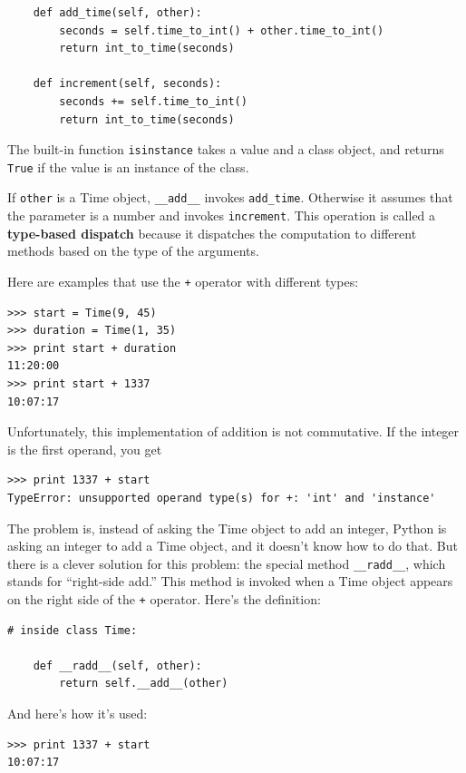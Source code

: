 \documentclass[10pt]{book}
\begin{document}
\begin{CJK}{UTF8}{gbsn}
\begin{verbatim}
    def add_time(self, other):
        seconds = self.time_to_int() + other.time_to_int()
        return int_to_time(seconds)

    def increment(self, seconds):
        seconds += self.time_to_int()
        return int_to_time(seconds)
\end{verbatim}
%
The built-in function {\tt isinstance} takes a value and a
class object, and returns {\tt True} if the value is an instance
of the class.

If {\tt other} is a Time object, \verb"__add__" invokes
\verb"add_time".  Otherwise it assumes that the parameter
is a number and invokes {\tt increment}.  This operation is
called a {\bf type-based dispatch} because it dispatches the
computation to different methods based on the type of the
arguments.

Here are examples that use the {\tt +} operator with different
types:

\begin{verbatim}
>>> start = Time(9, 45)
>>> duration = Time(1, 35)
>>> print start + duration
11:20:00
>>> print start + 1337
10:07:17
\end{verbatim}
%
Unfortunately, this implementation of addition is not commutative.
If the integer is the first operand, you get

\begin{verbatim}
>>> print 1337 + start
TypeError: unsupported operand type(s) for +: 'int' and 'instance'
\end{verbatim}
%
The problem is, instead of asking the Time object to add an integer,
Python is asking an integer to add a Time object, and it doesn't know
how to do that.  But there is a clever solution for this problem: the
special method \verb"__radd__", which stands for ``right-side add.''
This method is invoked when a Time object appears on the right side of
the {\tt +} operator.  Here's the definition:

\begin{verbatim}
# inside class Time:

    def __radd__(self, other):
        return self.__add__(other)
\end{verbatim}
%
And here's how it's used:

\begin{verbatim}
>>> print 1337 + start
10:07:17
\end{verbatim}
%


\end{CJK}
\end{document}
